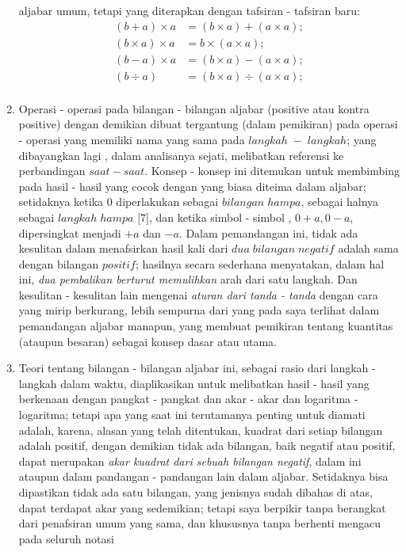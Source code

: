 \documentclass[a4paper, 12pt]{book}
\begin{document}
\begin{enumerate}
aljabar umum, tetapi yang diterapkan dengan tafsiran - tafsiran baru:
\begin{align*}
(b + a) \times a  &= (b \times a) + (a \times a); \\
(b \times a) \times a  &= b \times (a \times a); \\
(b - a) \times a  &= (b \times a) - (a \times a); \\
(b \div a) &= (b \times a) \div (a \times a); \\
\end{align*}
\item Operasi - operasi pada bilangan - bilangan aljabar (positive atau kontra
positive) dengan demikian dibuat tergantung (dalam pemikiran) pada operasi -
operasi yang memiliki nama yang sama pada $langkah\;-\;langkah$; yang dibayangkan
lagi , dalam analisanya sejati, melibatkan referensi ke perbandingan 
$saat-saat$. Konsep - konsep ini ditemukan untuk membimbing pada hasil -
hasil yang cocok dengan yang biasa diteima dalam aljabar; setidaknya ketika
0 diperlakukan sebagai $bilangan\;hampa$, sebagai halnya sebagai 
$langkah\;hampa$ [7], dan ketika simbol - simbol , $0 + a, 0 - a$, dipersingkat
menjadi $+a$ dan $-a$. Dalam pemandangan ini, tidak ada kesulitan dalam 
menafsirkan hasil kali dari $dua\; bilangan\; negatif$ adalah sama dengan 
bilangan $positif$; hasilnya secara sederhana menyatakan, dalam hal ini, 
\textit{dua pembalikan berturut
memulihkan} arah dari satu langkah. Dan kesulitan - kesulitan lain mengenai
\textit{aturan dari tanda - tanda} dengan cara yang mirip berkurang, lebih
sempurna dari yang pada saya terlihat dalam pemandangan aljabar manapun, yang
membuat pemikiran tentang kuantitas (ataupun besaran) sebagai konsep dasar 
atau utama.
\item Teori tentang bilangan - bilangan aljabar ini, sebagai rasio dari langkah
 - langkah dalam waktu, diaplikasikan untuk melibatkan hasil - hasil yang
berkenaan dengan pangkat - pangkat dan akar - akar dan logaritma - logaritma;
tetapi apa yang saat ini terutamanya penting untuk diamati adalah, karena, 
alasan yang telah ditentukan, kuadrat dari setiap bilangan adalah positif, 
dengan demikian tidak ada bilangan, baik negatif atau positif, dapat merupakan
\textit{akar kuadrat dari sebuah bilangan negatif}, dalam ini ataupun dalam
pandangan - pandangan lain dalam aljabar. Setidaknya bisa dipastikan
tidak ada satu bilangan, yang jenisnya sudah dibahas di atas, dapat terdapat
akar yang sedemikian; tetapi saya berpikir tanpa berangkat dari penafsiran
umum yang sama, dan khususnya tanpa berhenti mengacu pada seluruh notasi 

\end{enumerate}
\end{document}
